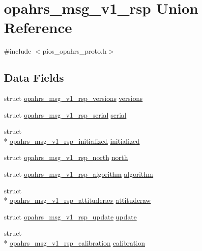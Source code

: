 \hypertarget{unionopahrs__msg__v1__rsp}{\section{opahrs\-\_\-msg\-\_\-v1\-\_\-rsp Union Reference}
\label{unionopahrs__msg__v1__rsp}
}


{\ttfamily \#include $<$pios\-\_\-opahrs\-\_\-proto.\-h$>$}

\subsection*{Data Fields}
\begin{DoxyCompactItemize}
\item 
struct \hyperlink{structopahrs__msg__v1__rsp__versions}{opahrs\-\_\-msg\-\_\-v1\-\_\-rsp\-\_\-versions} \hyperlink{unionopahrs__msg__v1__rsp_afc10e960b1c0ce91b8ac14c6d926e2e2}{versions}
\item 
struct \hyperlink{structopahrs__msg__v1__rsp__serial}{opahrs\-\_\-msg\-\_\-v1\-\_\-rsp\-\_\-serial} \hyperlink{unionopahrs__msg__v1__rsp_a5f1415956f4771d4abb81113e2217bbb}{serial}
\item 
struct \\*
\hyperlink{structopahrs__msg__v1__rsp__initialized}{opahrs\-\_\-msg\-\_\-v1\-\_\-rsp\-\_\-initialized} \hyperlink{unionopahrs__msg__v1__rsp_a2a6bb8401a1d24136804f580cbb4e11d}{initialized}
\item 
struct \hyperlink{structopahrs__msg__v1__rsp__north}{opahrs\-\_\-msg\-\_\-v1\-\_\-rsp\-\_\-north} \hyperlink{unionopahrs__msg__v1__rsp_aad5973ea0cfa49bfcf5c577a3f1053d4}{north}
\item 
struct \hyperlink{structopahrs__msg__v1__rsp__algorithm}{opahrs\-\_\-msg\-\_\-v1\-\_\-rsp\-\_\-algorithm} \hyperlink{unionopahrs__msg__v1__rsp_a4af9b8f5f9eed55411351398ece97f47}{algorithm}
\item 
struct \\*
\hyperlink{structopahrs__msg__v1__rsp__attituderaw}{opahrs\-\_\-msg\-\_\-v1\-\_\-rsp\-\_\-attituderaw} \hyperlink{unionopahrs__msg__v1__rsp_ab96ad84f9d2d22faf24cb780f2da6ebe}{attituderaw}
\item 
struct \hyperlink{structopahrs__msg__v1__rsp__update}{opahrs\-\_\-msg\-\_\-v1\-\_\-rsp\-\_\-update} \hyperlink{unionopahrs__msg__v1__rsp_aa3af75c186395d79e467c071f5e08103}{update}
\item 
struct \\*
\hyperlink{structopahrs__msg__v1__rsp__calibration}{opahrs\-\_\-msg\-\_\-v1\-\_\-rsp\-\_\-calibration} \hyperlink{unionopahrs__msg__v1__rsp_a9f9eca2cf183979d62cb16eb92782e42}{calibration}
\end{DoxyCompactItemize}


